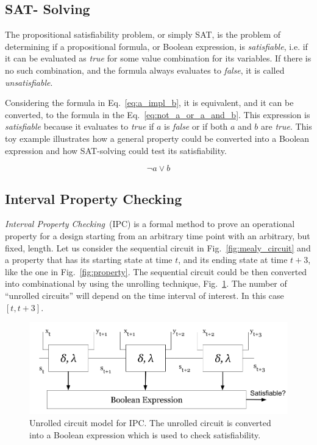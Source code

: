 \subsection*{SAT- Solving}

The propositional satisfiability problem, or simply SAT, is the problem of determining if a propositional formula, or Boolean expression, is \textit{satisfiable}, i.e. if it can be evaluated as \textit{true} for some value combination for its variables. If there is no such combination, and the formula always evaluates to \textit{false}, it is called \textit{unsatisfiable}. 

Considering the formula in Eq.~\ref{eq:a_impl_b}, it is equivalent, and it can be converted, to the formula in the Eq.~\ref{eq:not_a_or_a_and_b}. This expression is \textit{satisfiable} because it evaluates to \textit{true} if $a$ is \textit{false} or if both $a$ and $b$ are \textit{true}. This toy example illustrates how a general property could be converted into a Boolean expression and how SAT-solving could test its satisfiability.

\begin{equation}
    \neg a \lor  b
    \label{eq:not_a_or_a_and_b}
\end{equation}

\subsection{Interval Property Checking}
\label{subsection:ipc}

\textit{Interval Property Checking}~(IPC) is a formal method to prove an operational property for a design starting from an arbitrary time point with an arbitrary, but fixed, length. Let us consider the sequential circuit in Fig.~\ref{fig:mealy_circuit} and a property that has its starting state at time $t$, and its ending state at time $t+3$, like the one in Fig.~\ref{fig:property}. The sequential circuit could be then converted into combinational by using the unrolling technique, Fig.~\ref{fig:unrolled}. The number of “unrolled circuits” will depend on the time interval of interest. In this case $[t, t+3]$.

\begin{figure}[htb!]
	\centering
	\includegraphics[width=\textwidth]{images/unrolled_circuit.png}
	\caption{Unrolled circuit model for IPC. The unrolled circuit is converted into a Boolean expression which is used to check satisfiability.}
	\label{fig:unrolled}
\end{figure}


